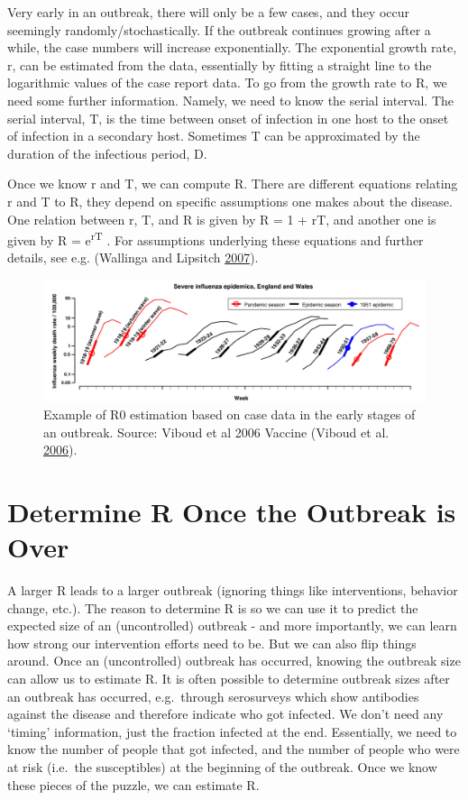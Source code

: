 \documentclass[]{book}
\theoremstyle{definition}
\theoremstyle{definition}
\theoremstyle{definition}
\theoremstyle{remark}
\begin{document}
Very early in an outbreak, there will only be a few cases, and they
occur seemingly randomly/stochastically. If the outbreak continues
growing after a while, the case numbers will increase exponentially. The
exponential growth rate, r, can be estimated from the data, essentially
by fitting a straight line to the logarithmic values of the case report
data. To go from the growth rate to R, we need some further information.
Namely, we need to know the serial interval. The serial interval, T, is
the time between onset of infection in one host to the onset of
infection in a secondary host. Sometimes T can be approximated by the
duration of the infectious period, D.

Once we know r and T, we can compute R. There are different equations
relating r and T to R, they depend on specific assumptions one makes
about the disease. One relation between r, T, and R is given by R = 1 +
rT, and another one is given by R = e\textsuperscript{rT} . For
assumptions underlying these equations and further details, see e.g.
(Wallinga and Lipsitch \protect\hyperlink{ref-wallinga07}{2007}).

\begin{figure}
\centering
\includegraphics{./images/viboud-R0.pdf}
\caption{\label{fig:viboudR0}Example of R0 estimation based on case data in
the early stages of an outbreak. Source: Viboud et al 2006 Vaccine
(Viboud et al. \protect\hyperlink{ref-viboud06}{2006}).}
\end{figure}

\section{Determine R Once the Outbreak is
Over}\label{determine-r-once-the-outbreak-is-over}

A larger R leads to a larger outbreak (ignoring things like
interventions, behavior change, etc.). The reason to determine R is so
we can use it to predict the expected size of an (uncontrolled) outbreak
- and more importantly, we can learn how strong our intervention efforts
need to be. But we can also flip things around. Once an (uncontrolled)
outbreak has occurred, knowing the outbreak size can allow us to
estimate R. It is often possible to determine outbreak sizes after an
outbreak has occurred, e.g.~through serosurveys which show antibodies
against the disease and therefore indicate who got infected. We don't
need any `timing' information, just the fraction infected at the end.
Essentially, we need to know the number of people that got infected, and
the number of people who were at risk (i.e.~the susceptibles) at the
beginning of the outbreak. Once we know these pieces of the puzzle, we
can estimate R.
\end{document}
